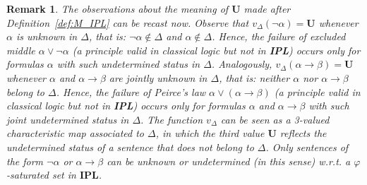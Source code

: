 \documentclass[12pt]{article}
\newtheorem{remark}[theorem]{Remark}
\newcommand{\bU}{\mathbf{U}}
\newcommand{\ipl}{\ensuremath{\mathbf{IPL}}}
\begin{document}
\begin{remark} \label{ren:canval}
The observations about the meaning of $\bU$ made after Definition~\ref{def:M_IPL} can be recast now.
Observe that $v_\Delta(\neg\alpha)=\bU$ whenever $\alpha$ is unknown in $\Delta$, that is: $\neg\alpha \notin \Delta$ and $\alpha \notin \Delta$. Hence, the failure of excluded middle $\alpha \vee \neg\alpha$  (a principle valid in classical logic but not in  \textbf{IPL}) occurs only for formulas $\alpha$ with such undetermined status in $\Delta$. Analogously, $v_\Delta(\alpha\to\beta)=\bU$ whenever $\alpha$ and $\alpha\to\beta$ are jointly unknown in $\Delta$, that is: neither $\alpha$ nor $\alpha\to\beta$ belong to $\Delta$. Hence, the failure of Peirce's law $\alpha \vee (\alpha \to\beta)$ (a principle valid in classical logic but not in  \textbf{IPL}) occurs only for formulas $\alpha$ and $\alpha\to\beta$ with such joint undetermined status in $\Delta$. The function $v_\Delta$ can be seen as a 3-valued characteristic map associated to $\Delta$, in which the third value $\bU$ reflects the undetermined status of a sentence that does not belong to $\Delta$. Only sentences of the form $\neg\alpha$ or $\alpha \to \beta$ can be unknown or undetermined (in this sense) w.r.t.  a $\varphi$-saturated set in \ipl.
\end{remark}
\end{document}
